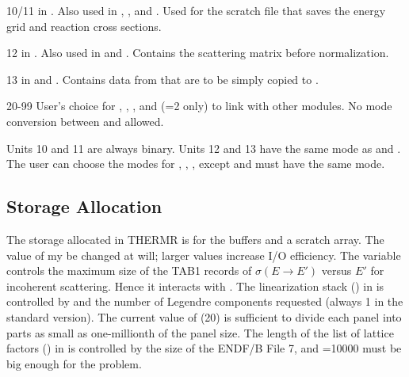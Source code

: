 \begin{list}{}{\leftmargin=.75in=.25in=.5in}
\begin{singlespace}

\item[10/11]  in .  Also used in
   , , and .  Used for the
    scratch file that saves the energy grid
   and reaction cross sections.
\item[12]   in .  Also used in 
   and .  Contains the scattering matrix before normalization.
\item[13]   in  and .  Contains
   data from  that are to be simply copied to .
\item[20-99]  User's choice for , , ,
   and  (=2 only) to link with other modules.
   No mode conversion between  and  allowed.

\end{singlespace}
\end{list}

Units 10 and 11 are always binary.  Units 12 and 13 have the same mode
as  and .  The user can choose the modes for
, , , except  and
 must have the same mode.

\subsection{Storage Allocation}
\label{ssTHERMR_storage}

The storage allocated in THERMR is for the 
buffers and a scratch array.   The value of  my be changed
at will; larger values increase I/O efficiency.  The variable 
controls the maximum size of the TAB1 records of $\sigma(E\rightarrow E')$
versus $E'$ for incoherent scattering.  Hence it interacts with .
The linearization stack () in  is controlled by
 and the number of Legendre components requested (always 1
in the standard version).  The current value of  (20) is
sufficient to divide each panel into parts as small as one-millionth
of the panel size.  The length of the list of lattice factors ()
in  is controlled by the size of the ENDF/B File 7, and
=10000 must be big enough for the problem.

\cleardoublepage
